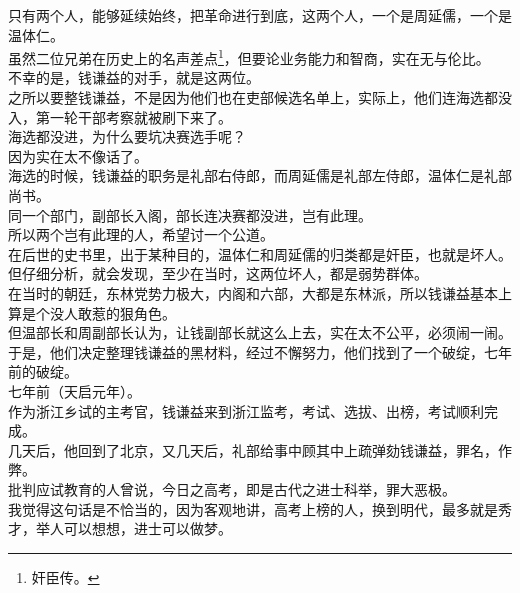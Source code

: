 \begin{multicols}{\theparacolNo}
只有两个人，能够延续始终，把革命进行到底，这两个人，一个是周延儒，一个是温体仁。\\

虽然二位兄弟在历史上的名声差点\footnote{奸臣传。}，但要论业务能力和智商，实在无与伦比。\\

不幸的是，钱谦益的对手，就是这两位。\\

之所以要整钱谦益，不是因为他们也在吏部候选名单上，实际上，他们连海选都没入，第一轮干部考察就被刷下来了。\\

海选都没进，为什么要坑决赛选手呢？\\

因为实在太不像话了。\\

海选的时候，钱谦益的职务是礼部右侍郎，而周延儒是礼部左侍郎，温体仁是礼部尚书。\\

同一个部门，副部长入阁，部长连决赛都没进，岂有此理。\\

所以两个岂有此理的人，希望讨一个公道。\\

在后世的史书里，出于某种目的，温体仁和周延儒的归类都是奸臣，也就是坏人。但仔细分析，就会发现，至少在当时，这两位坏人，都是弱势群体。\\

在当时的朝廷，东林党势力极大，内阁和六部，大都是东林派，所以钱谦益基本上算是个没人敢惹的狠角色。\\

但温部长和周副部长认为，让钱副部长就这么上去，实在太不公平，必须闹一闹。\\

于是，他们决定整理钱谦益的黑材料，经过不懈努力，他们找到了一个破绽，七年前的破绽。\\

七年前（天启元年）。\\

作为浙江乡试的主考官，钱谦益来到浙江监考，考试、选拔、出榜，考试顺利完成。\\

几天后，他回到了北京，又几天后，礼部给事中顾其中上疏弹劾钱谦益，罪名，作弊。\\

批判应试教育的人曾说，今日之高考，即是古代之进士科举，罪大恶极。\\

我觉得这句话是不恰当的，因为客观地讲，高考上榜的人，换到明代，最多就是秀才，举人可以想想，进士可以做梦。\\


\end{multicols}
